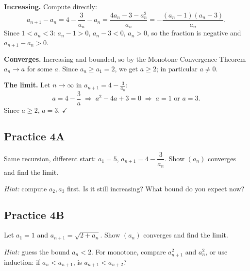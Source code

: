 \documentclass[11pt]{article}
\begin{document}
\textbf{Increasing.} Compute directly:
\[
  a_{n+1}-a_n = 4-\frac3{a_n}-a_n = \frac{4a_n-3-a_n^2}{a_n}
  = -\frac{(a_n-1)(a_n-3)}{a_n}.
\]
Since $1<a_n<3$: $a_n-1>0$, $a_n-3<0$, $a_n>0$, so the fraction is negative
and $a_{n+1}-a_n>0$.

\textbf{Converges.} Increasing and bounded, so by the Monotone Convergence
Theorem $a_n\to a$ for some $a$. Since $a_n\ge a_1=2$, we get $a\ge2$; in
particular $a\neq0$.

\textbf{The limit.} Let $n\to\infty$ in $a_{n+1}=4-\frac3{a_n}$:
\[
  a = 4-\frac3a \;\Longrightarrow\; a^2-4a+3=0 \;\Longrightarrow\; a=1 \text{ or } a=3 .
\]
Since $a\ge 2$, $a=3$. \hfill$\checkmark$

\subsection*{Practice 4A}
Same recursion, different start: $a_1=5$, $a_{n+1}=4-\dfrac3{a_n}$.
Show $(a_n)$ converges and find the limit.

\emph{Hint:} compute $a_2,a_3$ first. Is it still increasing? What bound do you
expect now?

\vspace{4cm}

\subsection*{Practice 4B}
Let $a_1=1$ and $a_{n+1}=\sqrt{2+a_n}$. Show $(a_n)$ converges and find the
limit.

\emph{Hint:} guess the bound $a_n<2$. For monotone, compare $a_{n+1}^2$ and
$a_n^2$, or use induction: if $a_n<a_{n+1}$, is $a_{n+1}<a_{n+2}$?

\vspace{4cm}
\end{document}
